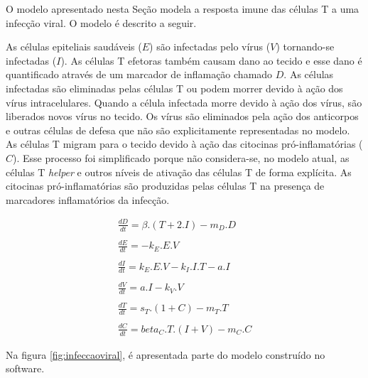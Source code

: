\documentclass[
	12pt,				%
	openright,			%
	oneside,			%
	a4paper,			%
	main=brazil,
	english,			%
	]{ufsj-abntex2}
\begin{document}
O modelo apresentado nesta Seção modela a resposta imune das células T a uma infecção viral. O modelo é descrito a seguir.  

As células epiteliais saudáveis ($E$) são infectadas pelo vírus ($V$) tornando-se infectadas ($I$). As células T efetoras também causam dano ao tecido e esse dano é quantificado através de um marcador de inflamação chamado $D$. As células infectadas são eliminadas pelas células T ou podem morrer devido à ação dos vírus intracelulares. Quando a célula infectada morre devido à ação dos vírus, são liberados novos vírus no tecido. Os vírus são eliminados pela ação dos anticorpos e outras células de defesa que não são explicitamente representadas no modelo. As células T migram para o tecido devido à ação das citocinas pró-inflamatórias ($C$). Esse processo foi simplificado porque não considera-se, no modelo atual, as células T \textit{helper} e outros níveis de ativação das células T de forma explícita. As citocinas pró-inflamatórias são produzidas pelas células T na presença de marcadores inflamatórios da infecção.   

\begin{equation}
    \begin{array}{lr}
        \frac{dD}{dt} = \beta.(T + 2.I) - m_D.D
        \\
        \\
        \frac{dE}{dt} = - k_E.E.V 
        \\
        \\
        \frac{dI}{dt} = k_E.E.V - k_I.I.T - a.I
        \\
        \\
        \frac{dV}{dt} = a.I - k_V.V
        \\
        \\
        \frac{dT}{dt} = s_T.(1+C)  - m_T.T
        \\
        \\
        \frac{dC}{dt} = beta_C.T.(I + V) - m_C.C
    \end{array}
\end{equation}

Na figura \ref{fig:infeccaoviral}, é apresentada parte do modelo construído no software.
\end{document}
